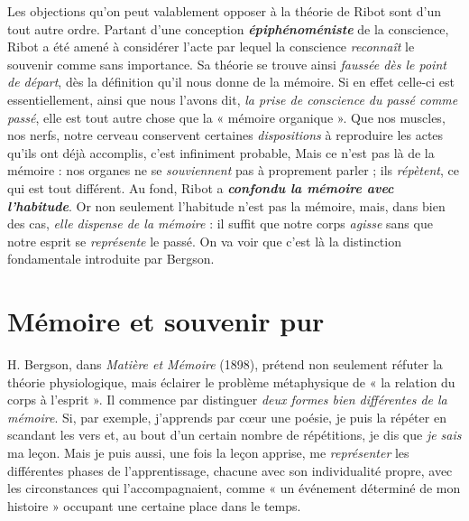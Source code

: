 Les objections qu’on peut valablement opposer à la théorie de
Ribot sont d’un tout autre ordre. Partant d’une conception \textbf{\textit {épiphénoméniste}}
de la conscience, Ribot a été amené à considérer l’acte
par lequel la conscience {\it reconnaît} le souvenir comme sans importance.
Sa théorie se trouve ainsi {\it faussée dès le point de départ}, dès la définition
qu’il nous donne de la mémoire. Si en effet celle-ci est essentiellement,
ainsi que nous l’avons dit, {\it la prise de conscience du passé
comme passé}, elle est tout autre chose que la « mémoire organique ».
Que nos muscles, nos nerfs, notre cerveau conservent certaines {\it dispositions}
à reproduire les actes qu’ils ont déjà accomplis, c’est infiniment
probable, Mais ce n’est pas là de la mémoire : nos organes ne se
{\it souviennent} pas à proprement parler ; ils {\it répètent}, ce qui est tout différent.
Au fond, Ribot a \textbf{\textit {confondu la mémoire avec l'habitude}}. Or non
seulement l'habitude n’est pas la mémoire, mais, dans bien des cas,
{\it elle dispense de la mémoire} : il suffit que notre corps {\it agisse} sans que
notre esprit se {\it représente} le passé. On va voir que c’est là la distinction
fondamentale introduite par Bergson.

\section{Mémoire et souvenir pur}%
H. Bergson, dans {\it Matière
et Mémoire} (1898), prétend non seulement réfuter la théorie physiologique,
mais éclairer le problème métaphysique de « la relation du
corps à l’esprit ». Il commence par distinguer {\it deux formes bien différentes
de la mémoire}. Si, par exemple, j'apprends par cœur une poésie,
je puis la répéter en scandant les vers et, au bout d’un certain nombre
de répétitions, je dis que {\it je sais} ma leçon. Mais je puis aussi, une fois
la leçon apprise, me {\it représenter} les différentes phases de l’apprentissage,
chacune avec son individualité propre, avec les circonstances
qui l’accompagnaient, comme « un événement déterminé de mon
histoire » occupant une certaine place dans le temps.


